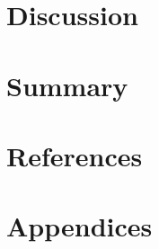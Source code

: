 \documentclass[letterpaper,11pt]{report}
\newcounter{insertpages}
\begin{document}


\chapter{Discussion}\label{ch:discussion}


\chapter{Summary}\label{ch:summary}


\chapter{References}\label{ch:references}
\printbibliography[heading=none,sorting=none]

\chapter{Appendices}\label{ch:appendices}

\setcounter{insertpages}{0}

\setcounter{insertpages}{0}

\setcounter{insertpages}{0}
\end{document}

